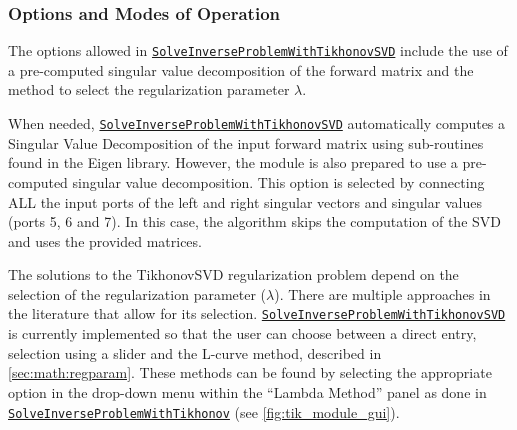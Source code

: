     \subsubsection{Options and Modes of Operation}
    
    The options allowed in \href{http://scirundocwiki.sci.utah.edu/SCIRunDocs/index.php5/CIBC:Documentation:SCIRun:Reference:BioPSE:SolveInverseProblemWithTikhonovSVD}{{\tt SolveInverseProblemWithTikhonovSVD}} include the use of a pre-computed singular value decomposition of the forward matrix and the method to select the regularization parameter $\lambda$.
    
    
    When needed, \href{http://scirundocwiki.sci.utah.edu/SCIRunDocs/index.php5/CIBC:Documentation:SCIRun:Reference:BioPSE:SolveInverseProblemWithTikhonovSVD}{{\tt SolveInverseProblemWithTikhonovSVD}} automatically computes a Singular Value Decomposition of the input forward matrix using sub-routines found in the Eigen library.
    However, the module is also prepared to use a pre-computed singular value decomposition. 
    This option is selected by connecting ALL the input ports of the left and right singular vectors and singular values (ports 5, 6 and 7).
    In this case, the algorithm skips the computation of the SVD and uses the provided matrices.
    
    
    The solutions to the TikhonovSVD regularization problem depend on the selection of the regularization parameter ($\lambda$).
    There are multiple approaches in the literature that allow for its selection.
    \href{http://scirundocwiki.sci.utah.edu/SCIRunDocs/index.php5/CIBC:Documentation:SCIRun:Reference:BioPSE:SolveInverseProblemWithTikhonovSVD}{{\tt SolveInverseProblemWithTikhonovSVD}} is currently implemented so that the user can choose between a direct entry, selection using a slider and the L-curve method, described in \autoref{sec:math:regparam}.
    These methods can be found by selecting the appropriate option in the drop-down menu within the ``Lambda Method'' panel as done in \href{http://scirundocwiki.sci.utah.edu/SCIRunDocs/index.php/CIBC:Documentation:SCIRun:Reference:BioPSE:SolveInverseProblemWithTikhonov}{{\tt SolveInverseProblemWithTikhonov}} (see \autoref{fig:tik_module_gui}).
    
